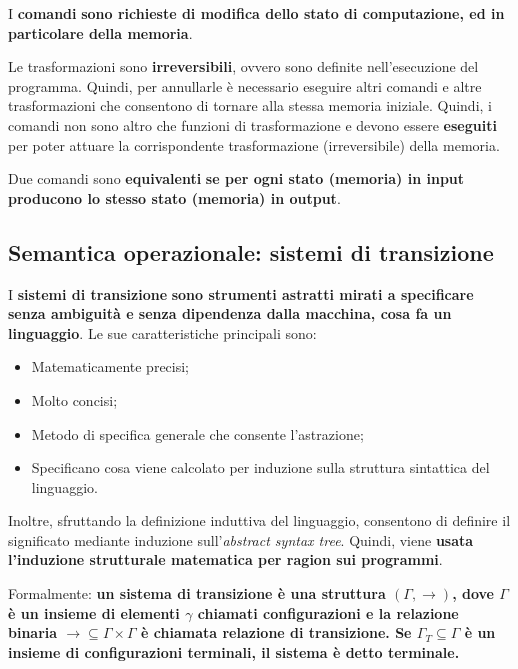 \documentclass[a4paper]{article}
\begin{document}
	I \textcolor{Red3}{\textbf{comandi}} \textbf{sono richieste di modifica dello stato di computazione, ed in particolare della memoria}.\newline
	
	\noindent
	Le trasformazioni sono \textbf{irreversibili}, ovvero sono definite nell'esecuzione del programma. Quindi, per annullarle è necessario eseguire altri comandi e altre trasformazioni che consentono di tornare alla stessa memoria iniziale. Quindi, i comandi non sono altro che funzioni di trasformazione e devono essere \textbf{eseguiti} per poter attuare la corrispondente trasformazione (irreversibile) della memoria.
	
	Due comandi sono \textcolor{Red3}{\textbf{equivalenti}} \textbf{se per ogni stato (memoria) in input producono lo stesso stato (memoria) in output}.\newpage
	
	\subsection{Semantica operazionale: sistemi di transizione}
	
	I \textcolor{Red3}{\textbf{sistemi di transizione}} \textbf{sono strumenti astratti mirati a specificare senza ambiguità e senza dipendenza dalla macchina, cosa fa un linguaggio}. Le sue caratteristiche principali sono:
	\begin{itemize}
		\item Matematicamente precisi;

		\item Molto concisi;

		\item Metodo di specifica generale che consente l'astrazione;

		\item Specificano cosa viene calcolato per induzione sulla struttura sintattica del linguaggio.
	\end{itemize}
	Inoltre, sfruttando la definizione induttiva del linguaggio, consentono di definire il significato mediante induzione sull'\emph{abstract syntax tree}. Quindi, viene \textbf{usata l'induzione strutturale matematica per ragion sui programmi}.\newline
	
	\noindent
	Formalmente: \textbf{un \textcolor{Red3}{sistema di transizione} è una struttura $\left(\Gamma, \rightarrow\right)$, dove $\Gamma$ è un insieme di elementi $\gamma$ chiamati configurazioni e la relazione binaria $\rightarrow \subseteq \Gamma \times \Gamma$ è chiamata relazione di transizione. Se $\Gamma_{T} \subseteq \Gamma$ è un insieme di configurazioni terminali, il sistema è detto terminale.}\newpage
	
\end{document}
